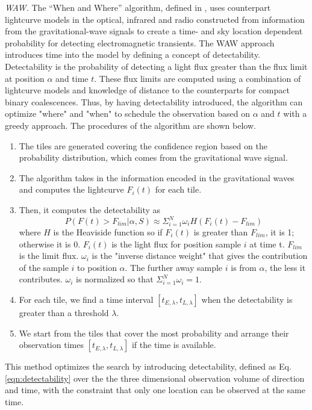 \documentclass[twocolumn]{aastex62}
\begin{document}
\emph{WAW.} The ``When and Where'' algorithm, defined in \cite{SoCo2017}, uses counterpart lightcurve models in the optical, infrared and radio constructed from information from the gravitational-wave signals to create a time- and sky location dependent probability for detecting electromagnetic transients. The WAW approach introduces time into the model by defining a concept of detectability. Detectability is the probability of detecting a light flux greater than the flux limit at position $\alpha$ and time $t$. These flux limits are computed using a combination of lightcurve models and knowledge of distance to the counterparts for compact binary coalescences. Thus, by having detectability introduced, the algorithm can optimize "where" and "when" to schedule the observation based on $\alpha$ and $t$ with a greedy approach. The procedures of the algorithm are shown below.
\begin{enumerate}
\item The tiles are generated covering the confidence region based on the probability distribution, which comes from the gravitational wave signal.
\item The algorithm takes in the information encoded in the gravitational waves and computes the lightcurve $F_i(t)$ for each tile. 
\item Then, it computes the detectability as
\begin{equation}\label{eqn:detectability}
P(F(t) > F_{lim}|\alpha, S)\approx\Sigma_{i=1}^N\omega_i H(F_i(t)-F_{lim})
\end{equation}
where $H$ is the Heaviside function so if $F_i(t)$ is greater than $F_{lim}$, it is 1; otherwise it is 0. $F_i(t)$ is the light flux for position sample $i$ at time t. $F_{lim}$ is the limit flux. $\omega_i$ is the "inverse distance weight" that gives the contribution of the sample $i$ to position $\alpha$. The further away sample $i$ is from $\alpha$, the less it contributes. $\omega_i$ is normalized so that $\Sigma_{i=1}^N\omega_i=1$. 
\item For each tile, we find a time interval $[t_{E,\lambda},t_{L,\lambda}]$ when the detectability is greater than a threshold $\lambda$.
\item We start from the tiles that cover the most probability and arrange their observation times $[t_{E,\lambda},t_{L,\lambda}]$ if the time is available.
\end{enumerate}
This method optimizes the search by introducing detectability, defined as Eq.\ref{eqn:detectability} over the the three dimensional observation volume of direction and time, with the constraint that only one location can be observed at the same time.
\end{document}
